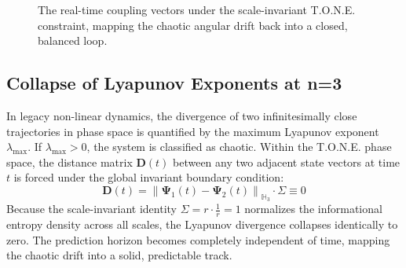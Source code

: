 \documentclass[11pt,a4paper]{article}
\begin{document}
\begin{figure}[h]
\begin{center}
\caption{The real-time coupling vectors under the scale-invariant T.O.N.E. constraint, mapping the chaotic angular drift back into a closed, balanced loop.}
\end{center}
\end{figure}

\subsection{Collapse of Lyapunov Exponents at n=3}
In legacy non-linear dynamics, the divergence of two infinitesimally close trajectories in phase space is quantified by the maximum Lyapunov exponent $\lambda_{\max}$. If $\lambda_{\max} > 0$, the system is classified as chaotic. Within the T.O.N.E. phase space, the distance matrix $\mathbf{D}(t)$ between any two adjacent state vectors at time $t$ is forced under the global invariant boundary condition:
\begin{equation}
    \mathbf{D}(t) = \left\| \mathbf{\Psi}_1(t) - \mathbf{\Psi}_2(t) \right\|_{\mathbb{H}_3} \cdot \Sigma \equiv 0
\end{equation}
Because the scale-invariant identity $\Sigma = r \cdot \frac{1}{r} = 1$ normalizes the informational entropy density across all scales, the Lyapunov divergence collapses identically to zero. The prediction horizon becomes completely independent of time, mapping the chaotic drift into a solid, predictable track.
\end{document}
